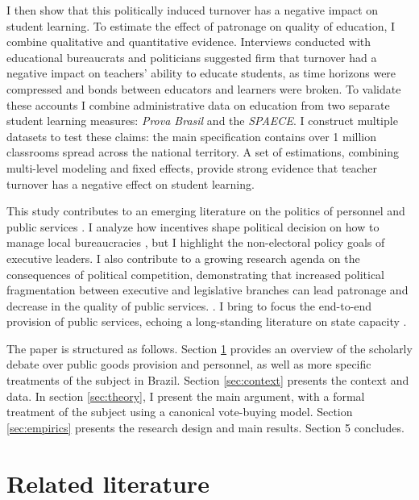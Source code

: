 \documentclass[12pt,a4paper]{article}
\begin{document}
I then show that this politically induced turnover has a negative impact on student learning. To estimate the effect of patronage on quality of education, I combine qualitative and quantitative evidence. Interviews conducted with educational bureaucrats and politicians suggested firm that turnover had a negative impact on teachers' ability to educate students, as time horizons were compressed and bonds between educators and learners were broken. To validate these accounts I combine administrative data on education from two separate student learning measures: \emph{Prova Brasil} and the \emph{SPAECE}. I construct multiple datasets to test these claims: the main specification contains over 1 million classrooms spread across the national territory. A set of estimations, combining multi-level modeling and fixed effects, provide strong evidence that teacher turnover has a negative effect on student learning.

This study contributes to an emerging literature on the politics of personnel and public services \citep{pepinsky_bureaucracy_2017, finan_personnel_2015}. I analyze how incentives shape political decision on how to manage local bureaucracies \citep{duflo_incentives_2012, gulzar_politicians_2017}, but I highlight the non-electoral policy goals of executive leaders. I also contribute to a growing research agenda on the consequences of political competition, demonstrating that increased political fragmentation between executive and legislative branches can lead patronage and decrease in the quality of public services. \citep{gottlieb_countervailing_2019, ferraz_corrupting_2012}. I bring to focus the end-to-end provision of public services, echoing a long-standing literature on state capacity \citep{kohli_state-directed_2004, evans_embedded_1995}.

The paper is structured as follows. Section \ref{sec:literature} provides an overview of the scholarly debate over public goods provision and personnel, as well as more specific treatments of the subject in Brazil. Section \ref{sec:context} presents the context and data. In section \ref{sec:theory}, I present the main argument, with a formal treatment of the subject using a canonical vote-buying model. Section \ref{sec:empirics} presents the research design and main results. Section 5 concludes.

\section{Related literature}
\label{sec:literature}
\end{document}
